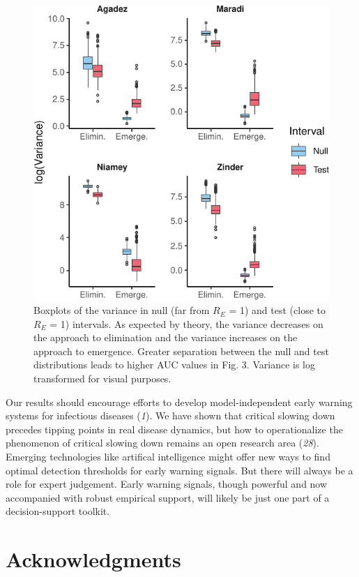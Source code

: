 \documentclass[3p]{elsarticle} %
\makeatletter
\def\maxwidth{\ifdim\Gin@nat@width>\linewidth\linewidth
\else\Gin@nat@width\fi}
\let\Oldincludegraphics\includegraphics
\renewcommand{\includegraphics}[1]{\Oldincludegraphics[width=\maxwidth]{#1}}
\makeatother
\begin{document}
\begin{figure}
\centering
\includegraphics{measles-ews-manuscript_files/figure-latex/var-ews-1.pdf}
\caption{Boxplots of the variance in null (far from \(R_E\) = 1) and
test (close to \(R_E\) = 1) intervals. As expected by theory, the
variance decreases on the approach to elimination and the variance
increases on the approach to emergence. Greater separation between the
null and test distributions leads to higher AUC values in Fig. 3.
Variance is log transformed for visual purposes. \label{var-ex}}
\end{figure}

Our results should encourage efforts to develop model-independent early
warning systems for infectious diseases (\emph{1}). We have shown that
critical slowing down precedes tipping points in real disease dynamics,
but how to operationalize the phenomenon of critical slowing down
remains an open research area (\emph{28}). Emerging technologies like
artifical intelligence might offer new ways to find optimal detection
thresholds for early warning signals. But there will always be a role
for expert judgement. Early warning signals, though powerful and now
accompanied with robust empirical support, will likely be just one part
of a decision-support toolkit.

\hypertarget{acknowledgments}{%
\section{Acknowledgments}\label{acknowledgments}}
\end{document}
